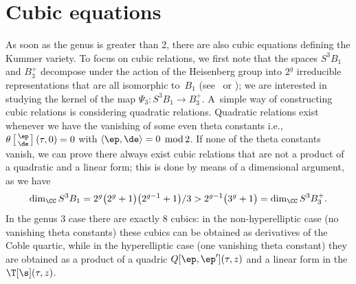\section{Cubic equations}

As soon as the genus is greater than 2, there are also cubic equations defining the Kummer va\-riety. To focus on cubic relations, we first note that the spaces $S^3 B_1$ and $B_3^+$ decompose under the action of the Heisenberg group into $2^g$ irreducible representations that are all isomorphic to~$B_1$ (see~\cite{vG} or \cite{Bea}); we are interested in studying the kernel of the map $ \Psi_3\colon S^3B_1\to B_3^+$. A~simple way of constructing cubic relations is considering quadratic relations. Quadratic relations exist whenever we have the vanishing of some even theta constants i.e., $ \theta\left[\begin{smallmatrix}\ep \\ \de\end{smallmatrix}\right] (\tau,0)=0$ with $\langle \ep , \de\rangle =0$ ${\rm mod}\, 2$. If none of the theta constants vanish, we can prove there always exist cubic relations that are not a product of a quadratic and a linear form; this is done by means of a dimensional argument, as we have
\[
 \dim_{\CC} S^3 B_1=2^g\big(2^g+1\big)\big(2^{g-1}+1\big)/3> 2^{g-1}\big( 3^g+1\big)=\dim_{\CC} S^3 B_3^+.
\]
 In the genus 3 case there are exactly 8 cubics: in the non-hyperelliptic case (no vanishing theta constants) these cubics can be obtained as derivatives of the Coble quartic, while in the hyperelliptic case (one vanishing theta constant) they are obtained as a product of a quadric $Q[\ep, \ep'](\tau, z)$ and a linear form in the $\T[\s](\tau,z)$.

